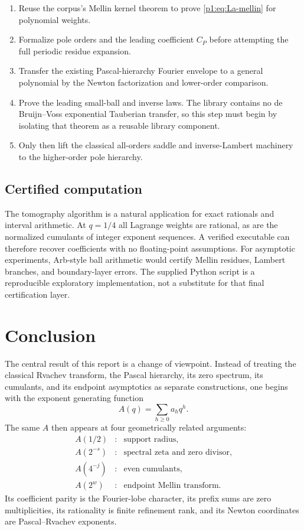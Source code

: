 \documentclass[11pt,oneside]{article}
\numberwithin{equation}{section}
\theoremstyle{definition}
\theoremstyle{remark}
\begin{document}
\begin{enumerate}
\item Reuse the corpus's Mellin kernel theorem to prove \eqref{p1:eq:La-mellin} for polynomial
      weights.
\item Formalize pole orders and the leading coefficient $C_P$ before attempting the full
      periodic residue expansion.
\item Transfer the existing Pascal-hierarchy Fourier envelope to a general polynomial by
      the Newton factorization and lower-order comparison.
\item Prove the leading small-ball and inverse laws.  The library contains no de
      Bruijn--Voss exponential Tauberian transfer, so this step must begin by isolating that
      theorem as a reusable library component.
\item Only then lift the classical all-orders saddle and inverse-Lambert machinery to the
      higher-order pole hierarchy.
\end{enumerate}

\subsection{Certified computation}

The tomography algorithm is a natural application for exact rationals and interval
arithmetic.  At $q=1/4$ all Lagrange weights are rational, as are the normalized cumulants of
integer exponent sequences.  A verified executable can therefore recover coefficients with
no floating-point assumptions.  For asymptotic experiments, Arb-style ball arithmetic would
certify Mellin residues, Lambert branches, and boundary-layer errors.  The supplied Python
script is a reproducible exploratory implementation, not a substitute for that final
certification layer.


\section{Conclusion}
\label{p1:sec:conclusion}

The central result of this report is a change of viewpoint.  Instead of treating the
classical Rvachev transform, the Pascal hierarchy, its zero spectrum, its cumulants, and its
endpoint asymptotics as separate constructions, one begins with the exponent generating
function
\[
 A(q)=\sum_{h\ge0}a_hq^h.
\]
The same $A$ then appears at four geometrically related arguments:
\begin{equation}
 \begin{array}{ccl}
 A(1/2) &:& \text{support radius},\\
 A(2^{-s}) &:& \text{spectral zeta and zero divisor},\\
 A(4^{-j}) &:& \text{even cumulants},\\
 A(2^w) &:& \text{endpoint Mellin transform}.
 \end{array}
 \label{p1:eq:four-samples-summary}
\end{equation}
Its coefficient parity is the Fourier-lobe character, its prefix sums are zero
multiplicities, its rationality is finite refinement rank, and its Newton coordinates are
Pascal--Rvachev exponents.
\end{document}
